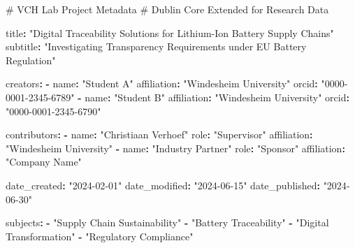 \documentclass[
  oneside,
  open=any]{scrbook}
\newenvironment{Shaded}{\begin{snugshade}}{\end{snugshade}}
\newcommand{\AttributeTok}[1]{\textcolor[rgb]{0.40,0.45,0.13}{#1}}
\newcommand{\CommentTok}[1]{\textcolor[rgb]{0.37,0.37,0.37}{#1}}
\newcommand{\FunctionTok}[1]{\textcolor[rgb]{0.28,0.35,0.67}{#1}}
\newcommand{\KeywordTok}[1]{\textcolor[rgb]{0.00,0.23,0.31}{\textbf{#1}}}
\newcommand{\StringTok}[1]{\textcolor[rgb]{0.13,0.47,0.30}{#1}}
\begin{document}
\begin{Shaded}
\begin{Highlighting}[]
\CommentTok{\# VCH Lab Project Metadata}
\CommentTok{\# Dublin Core Extended for Research Data}

\FunctionTok{title}\KeywordTok{:}\AttributeTok{ }\StringTok{"Digital Traceability Solutions for Lithium{-}Ion Battery Supply Chains"}
\FunctionTok{subtitle}\KeywordTok{:}\AttributeTok{ }\StringTok{"Investigating Transparency Requirements under EU Battery Regulation"}

\FunctionTok{creators}\KeywordTok{:}
\AttributeTok{  }\KeywordTok{{-}}\AttributeTok{ }\FunctionTok{name}\KeywordTok{:}\AttributeTok{ }\StringTok{"Student A"}
\AttributeTok{    }\FunctionTok{affiliation}\KeywordTok{:}\AttributeTok{ }\StringTok{"Windesheim University"}
\AttributeTok{    }\FunctionTok{orcid}\KeywordTok{:}\AttributeTok{ }\StringTok{"0000{-}0001{-}2345{-}6789"}
\AttributeTok{  }\KeywordTok{{-}}\AttributeTok{ }\FunctionTok{name}\KeywordTok{:}\AttributeTok{ }\StringTok{"Student B"}
\AttributeTok{    }\FunctionTok{affiliation}\KeywordTok{:}\AttributeTok{ }\StringTok{"Windesheim University"}
\AttributeTok{    }\FunctionTok{orcid}\KeywordTok{:}\AttributeTok{ }\StringTok{"0000{-}0001{-}2345{-}6790"}

\FunctionTok{contributors}\KeywordTok{:}
\AttributeTok{  }\KeywordTok{{-}}\AttributeTok{ }\FunctionTok{name}\KeywordTok{:}\AttributeTok{ }\StringTok{"Christiaan Verhoef"}
\AttributeTok{    }\FunctionTok{role}\KeywordTok{:}\AttributeTok{ }\StringTok{"Supervisor"}
\AttributeTok{    }\FunctionTok{affiliation}\KeywordTok{:}\AttributeTok{ }\StringTok{"Windesheim University"}
\AttributeTok{  }\KeywordTok{{-}}\AttributeTok{ }\FunctionTok{name}\KeywordTok{:}\AttributeTok{ }\StringTok{"Industry Partner"}
\AttributeTok{    }\FunctionTok{role}\KeywordTok{:}\AttributeTok{ }\StringTok{"Sponsor"}
\AttributeTok{    }\FunctionTok{affiliation}\KeywordTok{:}\AttributeTok{ }\StringTok{"Company Name"}

\FunctionTok{date\_created}\KeywordTok{:}\AttributeTok{ }\StringTok{"2024{-}02{-}01"}
\FunctionTok{date\_modified}\KeywordTok{:}\AttributeTok{ }\StringTok{"2024{-}06{-}15"}
\FunctionTok{date\_published}\KeywordTok{:}\AttributeTok{ }\StringTok{"2024{-}06{-}30"}

\FunctionTok{subjects}\KeywordTok{:}
\AttributeTok{  }\KeywordTok{{-}}\AttributeTok{ }\StringTok{"Supply Chain Sustainability"}
\AttributeTok{  }\KeywordTok{{-}}\AttributeTok{ }\StringTok{"Battery Traceability"}
\AttributeTok{  }\KeywordTok{{-}}\AttributeTok{ }\StringTok{"Digital Transformation"}
\AttributeTok{  }\KeywordTok{{-}}\AttributeTok{ }\StringTok{"Regulatory Compliance"}


\end{Highlighting}
\end{Shaded}
\end{document}
